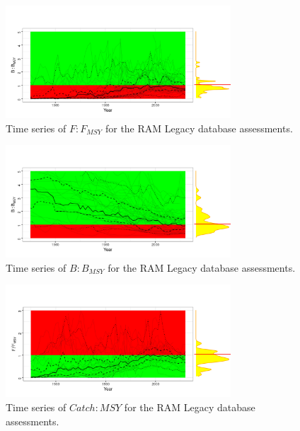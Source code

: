 \begin{figure}[ht!]
\centering
\includegraphics[width=0.75\textwidth]{figs/ts-f-1.png}
\caption{Time series of $F:F_{MSY}$ for the RAM Legacy database assessments.}
\label{fig:ts-f}
\end{figure}

\begin{figure}[ht!]
\centering
\includegraphics[width=0.75\textwidth]{figs/ts-ssb-1.png}
\caption{Time series of $B:B_{MSY}$ for the RAM Legacy database assessments.}
\label{fig:ts-s}
\end{figure}

\begin{figure}[ht!]
\centering
\includegraphics[width=0.75\textwidth]{figs/ts-c-1.png}
\caption{Time series of $Catch:MSY$ for the RAM Legacy database assessments.}
\label{fig:ts-c}
\end{figure}

